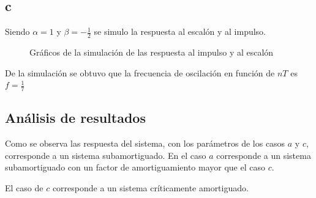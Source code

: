 \documentclass[../../guia1.tex]{subfiles}
\begin{document}
\subsection{c}
Siendo $\alpha = 1$ y $\beta = -\frac{1}{2}$ se simulo la respuesta al escalón y al impulso.
\begin{figure}[H]
 \centering

 \caption{Gráficos de la simulación de las respuesta al impulso y al escalón}
 \label{f:ejc}
\end{figure}
De la simulación se obtuvo que la frecuencia de oscilación en función de $nT$ es $f= \frac{1}{7}$
\subsection{Análisis de resultados}
Como se observa las respuesta del sistema, con los parámetros de los casos $a$ y $c$, corresponde a un sistema subamortiguado. En el caso $a$ corresponde a un sistema subamortiguado con un factor de amortiguamiento mayor que el caso $c$.
\par El caso de $c$ corresponde a un sistema críticamente amortiguado.
\end{document}
